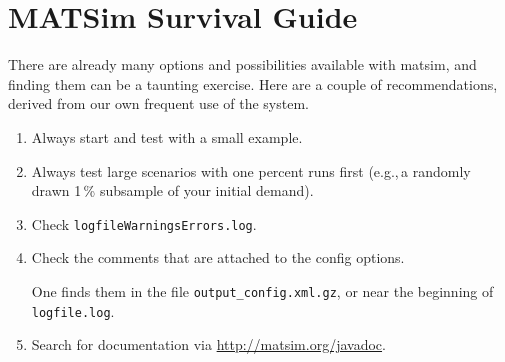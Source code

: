 \section{MATSim Survival Guide}
\label{sec:survival}
There are already many options and possibilities available with \gls{matsim}, and finding them can be a taunting exercise.  Here are a couple of recommendations, derived from our own frequent use of the system.
\begin{enumerate}

\item Always start and test with a small example.

\item Always test large scenarios with one percent runs first (e.g.,\,a randomly drawn 1\,\% subsample of your initial demand).

\item Check \lstinline{logfileWarningsErrors.log}.

\item Check the comments that are attached to the config options.

One finds them in the file \lstinline{output_config.xml.gz}, or near the beginning of \lstinline{logfile.log}.

\item Search for documentation via \url{http://matsim.org/javadoc}.

\end{enumerate}


